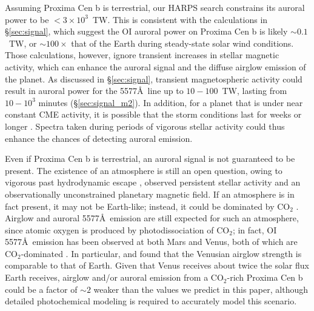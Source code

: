 \documentclass{emulateapj}
\begin{document}
Assuming Proxima Cen b is terrestrial, our HARPS search constrains its auroral power to be $< 3\times 10^{3}$~TW. This is consistent with the calculations in \S\ref{sec:signal}, which suggest the OI auroral power on Proxima Cen b is likely ${\sim} 0.1$~TW, or ${\sim} 100\times$ that of the Earth during steady-state solar wind conditions. Those calculations, however, ignore transient increases in stellar magnetic activity, which can enhance the auroral signal and the diffuse airglow emission of the planet. As discussed in \S\ref{sec:signal}, transient magnetospheric activity could result in auroral power for the 5577\AA\ line up to $10-100$~TW, lasting from $10-10^3$ minutes (\S\ref{sec:signal_m2}).  In addition, for a planet that is under near constant CME activity, it is possible that the storm conditions last for weeks or longer \citep{Gonzalez1994,Gonzalez1999}. Spectra taken during periods of vigorous stellar activity could thus enhance the chances of detecting auroral emission.

Even if Proxima Cen b is terrestrial, an auroral signal is not guaranteed to be present. The existence of an atmosphere is still an open question, owing to vigorous past hydrodynamic escape \citep{LugerBarnes2015, Barnes2016}, observed persistent stellar activity \citep{Davenport2016} and an observationally unconstrained planetary magnetic field. If an atmosphere is in fact present, it may not be Earth-like; instead, it could be dominated by CO$_2$ \citep[e.g.][]{Meadows2016}. Airglow and auroral 5577\AA\ emission are still expected for such an atmosphere, since atomic oxygen is produced by photodissociation of CO$_2$; in fact, OI 5577\AA\ emission has been observed at both Mars and Venus, both of which are CO$_2$-dominated \citep[e.g.][]{Bertaux2005, Slanger2001}. In particular, \citet{Slanger2001} and \citet{Slanger2006} found that the Venusian airglow strength is comparable to that of Earth. Given that Venus receives about twice the solar flux Earth receives, airglow and/or auroral emission from a CO$_2$-rich Proxima Cen b could be a factor of ${\sim}2$ weaker than the values we predict in this paper, although detailed photochemical modeling is required to accurately model this scenario.
\end{document}
